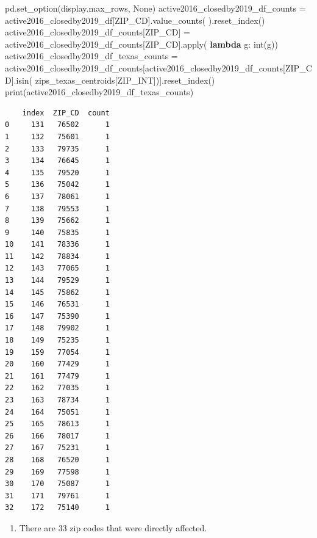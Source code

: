 \documentclass[
  letterpaper,
  DIV=11,
  numbers=noendperiod]{scrartcl}
\newenvironment{Shaded}{\begin{snugshade}}{\end{snugshade}}
\newcommand{\BuiltInTok}[1]{\textcolor[rgb]{0.00,0.23,0.31}{#1}}
\newcommand{\KeywordTok}[1]{\textcolor[rgb]{0.00,0.23,0.31}{\textbf{#1}}}
\newcommand{\NormalTok}[1]{\textcolor[rgb]{0.00,0.23,0.31}{#1}}
\newcommand{\OperatorTok}[1]{\textcolor[rgb]{0.37,0.37,0.37}{#1}}
\newcommand{\StringTok}[1]{\textcolor[rgb]{0.13,0.47,0.30}{#1}}
\newcommand{\VariableTok}[1]{\textcolor[rgb]{0.07,0.07,0.07}{#1}}
\providecommand{\tightlist}{%
  \setlength{\itemsep}{0pt}\setlength{\parskip}{0pt}}\usepackage{longtable,booktabs,array}
\begin{document}
\begin{Shaded}
\begin{Highlighting}[]
\NormalTok{pd.set\_option(}\StringTok{\textquotesingle{}display.max\_rows\textquotesingle{}}\NormalTok{, }\VariableTok{None}\NormalTok{)}
\NormalTok{active2016\_closedby2019\_df\_counts }\OperatorTok{=}\NormalTok{ active2016\_closedby2019\_df[}\StringTok{\textquotesingle{}ZIP\_CD\textquotesingle{}}\NormalTok{].value\_counts(}
\NormalTok{).reset\_index()}
\NormalTok{active2016\_closedby2019\_df\_counts[}\StringTok{\textquotesingle{}ZIP\_CD\textquotesingle{}}\NormalTok{] }\OperatorTok{=}\NormalTok{ active2016\_closedby2019\_df\_counts[}\StringTok{\textquotesingle{}ZIP\_CD\textquotesingle{}}\NormalTok{].}\BuiltInTok{apply}\NormalTok{(}
    \KeywordTok{lambda}\NormalTok{ g: }\BuiltInTok{int}\NormalTok{(g))}
\NormalTok{active2016\_closedby2019\_df\_texas\_counts }\OperatorTok{=}\NormalTok{ active2016\_closedby2019\_df\_counts[active2016\_closedby2019\_df\_counts[}\StringTok{\textquotesingle{}ZIP\_CD\textquotesingle{}}\NormalTok{].isin(}
\NormalTok{    zips\_texas\_centroids[}\StringTok{\textquotesingle{}ZIP\_INT\textquotesingle{}}\NormalTok{])].reset\_index()}
\BuiltInTok{print}\NormalTok{(active2016\_closedby2019\_df\_texas\_counts)}
\end{Highlighting}
\end{Shaded}

\begin{verbatim}
    index  ZIP_CD  count
0     131   76502      1
1     132   75601      1
2     133   79735      1
3     134   76645      1
4     135   79520      1
5     136   75042      1
6     137   78061      1
7     138   79553      1
8     139   75662      1
9     140   75835      1
10    141   78336      1
11    142   78834      1
12    143   77065      1
13    144   79529      1
14    145   75862      1
15    146   76531      1
16    147   75390      1
17    148   79902      1
18    149   75235      1
19    159   77054      1
20    160   77429      1
21    161   77479      1
22    162   77035      1
23    163   78734      1
24    164   75051      1
25    165   78613      1
26    166   78017      1
27    167   75231      1
28    168   76520      1
29    169   77598      1
30    170   75087      1
31    171   79761      1
32    172   75140      1
\end{verbatim}

\begin{enumerate}
\def\labelenumi{\arabic{enumi}.}
\setcounter{enumi}{1}
\tightlist
\item
  There are 33 zip codes that were directly affected.
\end{enumerate}
\end{document}
